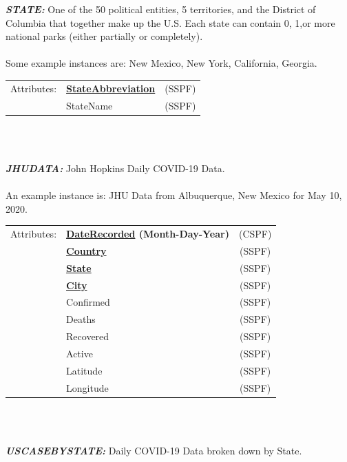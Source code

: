 \documentclass[11pt]{article}
\begin{document}
\begin{description}
\item{\em\bf STATE:} One of the 50 political entities, 5 territories, and the District of Columbia that together make up the U.S. Each state can contain 0, 1,or more national parks (either partially or completely). \\ \\

Some example instances are: New Mexico, New York, California, Georgia. \\
 
\begin{tabular}{llc}
 Attributes: & {\bf \underline{StateAbbreviation}} &  (SSPF) \\
	    & StateName &  (SSPF) \\
\end{tabular} \\
\\

\pagebreak

\item{\em\bf JHUDATA:} John Hopkins Daily COVID-19 Data. \\ \\

An example instance is: JHU Data from Albuquerque, New Mexico for May 10, 2020. \\
 
\begin{tabular}{llc}
 Attributes: & {\bf \underline{DateRecorded} (Month-Day-Year)} &  (CSPF) \\
	    & {\bf \underline{Country}} &  (SSPF) \\
	    & {\bf \underline{State}} & (SSPF) \\
	    & {\bf \underline{City}} & (SSPF) \\
	    & Confirmed & (SSPF) \\
	    & Deaths & (SSPF) \\
	    & Recovered & (SSPF) \\
	    & Active & (SSPF) \\
	    & Latitude & (SSPF) \\
	    & Longitude & (SSPF) \\
\end{tabular} \\
\\

\item{\em\bf USCASEBYSTATE:} Daily COVID-19 Data broken down by State. \\ \\


\end{description}
\end{document}
